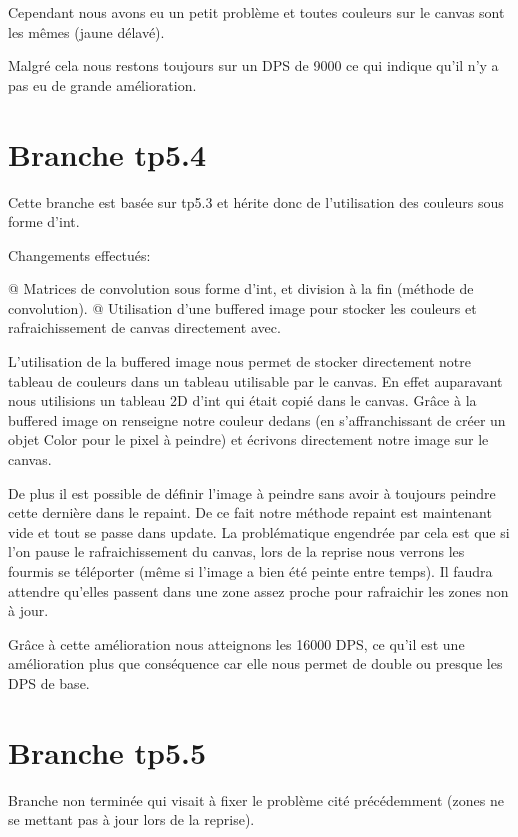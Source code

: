 \documentclass{report}
\begin{document}
		
		Cependant nous avons eu un petit problème et toutes couleurs sur le canvas sont les mêmes (jaune délavé).
		
		Malgré cela nous restons toujours sur un DPS de 9000 ce qui indique qu'il n'y a pas eu de grande amélioration.
		
	\chapter{Branche tp5.4}
		Cette branche est basée sur tp5.3 et hérite donc de l'utilisation des couleurs sous forme d'int.

		Changements effectués:
		\begin{easylist}[itemize]
			@ Matrices de convolution sous forme d'int, et division à la fin (méthode de convolution).
			@ Utilisation d'une buffered image pour stocker les couleurs et rafraichissement de canvas directement avec.
		\end{easylist}
		
		L'utilisation de la buffered image nous permet de stocker directement notre tableau de couleurs dans un tableau utilisable par le canvas.
		En effet auparavant nous utilisions un tableau 2D d'int qui était copié dans le canvas.
		Grâce à la buffered image on renseigne notre couleur dedans (en s'affranchissant de créer un objet Color pour le pixel à peindre) et écrivons directement notre image sur le canvas.
		
		De plus il est possible de définir l'image à peindre sans avoir à toujours peindre cette dernière dans le repaint.
		De ce fait notre méthode repaint est maintenant vide et tout se passe dans update.
		La problématique engendrée par cela est que si l'on pause le rafraichissement du canvas, lors de la reprise nous verrons les fourmis se téléporter (même si l'image a bien été peinte entre temps).
		Il faudra attendre qu'elles passent dans une zone assez proche pour rafraichir les zones non à jour.		
		
		Grâce à cette amélioration nous atteignons les 16000 DPS, ce qu'il est une amélioration plus que conséquence car elle nous permet de double ou presque les DPS de base.
		
	\chapter{Branche tp5.5}
		Branche non terminée qui visait à fixer le problème cité précédemment (zones ne se mettant pas à jour lors de la reprise).
\end{document}
